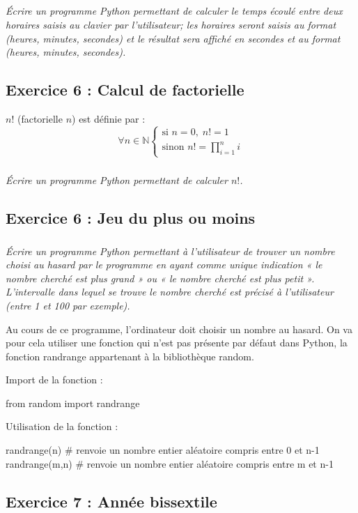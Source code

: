 \documentclass[10pt]{article}
\begin{document}
\subparagraph*{}
\textit{Écrire un programme Python permettant de calculer le temps écoulé entre deux horaires saisis au clavier par l'utilisateur; les horaires seront saisis au format (heures, minutes, secondes) et le résultat sera affiché en secondes et au format (heures, minutes, secondes).}

\subsection*{Exercice 6 : Calcul de factorielle}
$n!$ (factorielle $n$) est définie par :
$$
\forall n\in \mathbb{N} \left\{
\begin{array}{l}
\text{si } n=0, \; n! = 1 \\
\text{sinon } n! = \prod\limits_{i=1}^n i 
\end{array}
\right.
$$

\subparagraph*{}
\textit{Écrire un programme Python permettant de calculer $n!$.}


\subsection*{Exercice 6 : Jeu du plus ou moins}
\setcounter{subparagraph}{0}

\subparagraph*{}
\textit{Écrire un programme Python permettant à l’utilisateur de trouver un nombre choisi au hasard par le programme en ayant comme unique indication « le nombre cherché est plus grand » ou « le nombre cherché est plus petit ». L’intervalle dans lequel se trouve le nombre cherché est précisé à l’utilisateur (entre 1 et 100 par exemple).}

\begin{py}
Au cours de ce programme, l’ordinateur doit choisir un nombre au hasard. On va pour cela utiliser une fonction qui n’est pas présente par défaut dans Python, la fonction randrange appartenant à la bibliothèque random.

Import de la fonction :
\begin{python}
from random import randrange
\end{python}
Utilisation de la fonction :
\begin{python}
randrange(n) # renvoie un nombre entier aléatoire compris entre 0 et n-1
randrange(m,n) # renvoie un nombre entier aléatoire compris entre m et n-1
\end{python}
\end{py}



\subsection*{Exercice 7 : Année bissextile}
\setcounter{subparagraph}{0}
\end{document}
